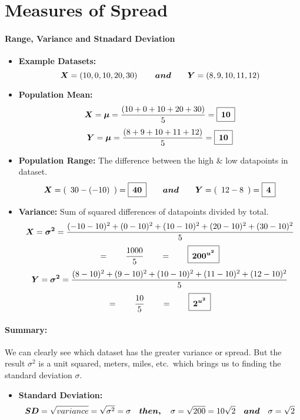 \documentclass[12pt]{article}
\newcommand\padBox[1]{{\setlength\fboxsep{5pt}\boxed{#1}}}
\newcommand{\negBi}[3][2]{(#2- #3)^{#1}}
\newcommand*{\mB}[1]{\ifmmode\bm{#1}\else\textbf{#1}\fi}
\begin{document}
\section*{Measures of Spread}
\begingroup
	\paragraph{Range, Variance and Stnadard Deviation}%
	\large
	\begin{itemize}
		\item\textbf{Example Datasets:}
			\[
				\mB{X}=
				\left(10, 0, 10, 20, 30\right)
				\qquad\mB{and}\qquad
				\mB{Y}=
				\left(8, 9, 10, 11, 12\right)
			\]
		\item\textbf{Population Mean:}
			\[
				\mB{X}=
				\mB{\mu}=\frac{\left(10 + 0 + 10 + 20 + 30\right)}{5}=
				\padBox{\mB{10}}
			\]
			\[
				\mB{Y}=
				\mB{\mu}=\frac{\left(8 + 9 + 10 + 11 + 12\right)}{5}=
				\padBox{\mB{10}}
			\]
		\item\textbf{Population Range: }
			The difference between the high \& low datapoints in dataset.
			\[
				\mB{X}=
				(\enspace30 - (-10)\enspace) = \padBox{\mB{40}}
				\qquad\mB{and}\qquad
				\mB{Y}=
				(\enspace12 - 8\enspace) = \padBox{\mB{4}}
			\]
		\item\textbf{Variance: }
		Sum of squared differences of datapoints divided by total.
			\[
				\mB{X}=
				\mB{\sigma^{2}} = \frac{
					\negBi{-10}{10} +
					\negBi{0}{10} +
					\negBi{10}{10} +
					\negBi{20}{10} +
					\negBi{30}{10}
				}
				{5}
			\]
			\[=\qquad\frac{1000}{5}\qquad=\qquad\padBox{\mB{200^{u^2}}}\]
			\[
				\mB{Y}=
				\mB{\sigma^{2}} = \frac{
					\negBi{8}{10} +
					\negBi{9}{10} +
					\negBi{10}{10} +
					\negBi{11}{10} +
					\negBi{12}{10}
				}
			{5}
			\]
			\[=\qquad\frac{10}{5}\qquad=\qquad\padBox{\mB{2^{u^2}}}\]
	\end{itemize}

\paragraph{Summary:}%

We can clearly see which dataset has the greater variance or spread.
But the result $\sigma^{2}$ is a unit squared, meters, miles, etc.\
which brings us to finding the standard deviation $\sigma$.

	\begin{itemize}
		\item\textbf{Standard Deviation:}
			\[
				\mB{SD} = \sqrt{variance} = \sqrt{\sigma^{2}} = \sigma
				\quad\mB{then, }\quad
				\sigma = \sqrt{200} = 10\sqrt{2} \quad\mB{and}\quad \sigma = \sqrt{2}
			\]
	\end{itemize}
\endgroup
\end{document}
